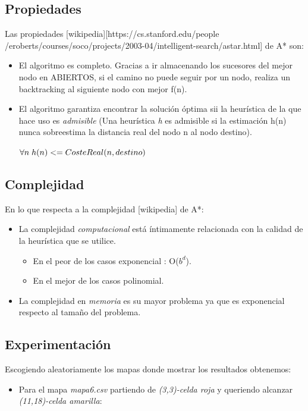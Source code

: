 \documentclass[conference]{IEEEtran}
\begin{document}
{\subsection{Propiedades}
Las propiedades [wikipedia][https://cs.stanford.edu/people
/eroberts/courses/soco/projects/2003-04/intelligent-search/astar.html] de A* son:
\begin{itemize}
\item El algoritmo es completo. Gracias a ir almacenando los sucesores del mejor nodo en ABIERTOS, si el camino no puede seguir por un nodo, realiza un backtracking al siguiente nodo con mejor f(n).
\item El algoritmo garantiza encontrar la solución óptima sii la heurística de la que hace uso es \textit{admisible} (Una heurística \textit{h} es admisible si la estimación h(n) nunca sobreestima la distancia real del nodo n al nodo destino).\\
\begin{center}$\forall n  \hspace{0.1cm} h(n) <= CosteReal(n,destino)$\end{center}
\end{itemize}

\subsection{Complejidad}

En lo que respecta a la complejidad [wikipedia] de A*:
\begin{itemize}
\item La complejidad \textit{computacional} está íntimamente relacionada con la calidad de la heurística que se utilice.
\begin{itemize}
\item En el peor de los casos exponencial : O($b^d$).
\item En el mejor de los casos polinomial.
\end{itemize}

\item La complejidad en \textit{memoria} es su mayor problema ya que es exponencial respecto al tamaño del problema.
\end{itemize}

\subsection{Experimentación}

Escogiendo aleatoriamente los mapas donde mostrar los resultados obtenemos:
\begin{itemize}
\item Para el mapa \textit{mapa6.csv} partiendo de \textit{(3,3)-celda roja} y queriendo alcanzar \textit{(11,18)-celda amarilla}:


\end{itemize}}
\end{document}
